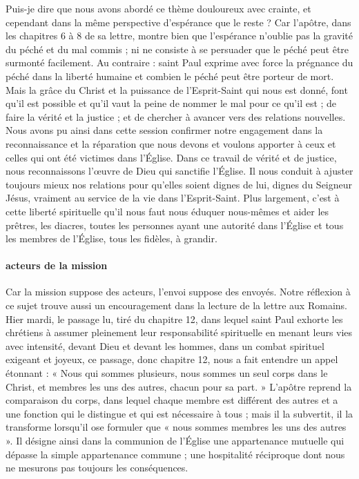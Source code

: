 Puis-je dire que nous avons abordé ce thème douloureux avec crainte, et cependant dans la même perspective d’espérance que le reste ? Car l’apôtre, dans les chapitres 6 à 8 de sa lettre, montre bien que l’espérance n’oublie pas la gravité du péché et du mal commis ; ni ne consiste à se persuader que le péché peut être surmonté facilement. Au contraire : saint Paul exprime avec force la prégnance du péché dans la liberté humaine et combien le péché peut être porteur de mort. Mais la grâce du Christ et la puissance de l’Esprit-Saint qui nous est donné, font qu’il est possible et qu’il vaut la peine de nommer le mal pour ce qu’il est ; de faire la vérité et la justice ; et de chercher à avancer vers des relations nouvelles.
Nous avons pu ainsi dans cette session confirmer notre engagement dans la reconnaissance et la réparation que nous devons et voulons apporter à ceux et celles qui ont été victimes dans l’Église. Dans ce travail de vérité et de justice, nous reconnaissons l’œuvre de Dieu qui sanctifie l’Église. Il nous conduit à ajuster toujours mieux nos relations pour qu’elles soient dignes de lui, dignes du Seigneur Jésus, vraiment au service de la vie dans l’Esprit-Saint. Plus largement, c’est à cette liberté spirituelle qu’il nous faut nous éduquer nous-mêmes et aider les prêtres, les diacres, toutes les personnes ayant une autorité dans l’Église et tous les membres de l’Église, tous les fidèles, à grandir.
\paragraph{acteurs de la mission}
Car la mission suppose des acteurs, l’envoi suppose des envoyés. Notre réflexion à ce sujet trouve aussi un encouragement dans la lecture de la lettre aux Romains. Hier mardi, le passage lu, tiré du chapitre 12, dans lequel saint Paul exhorte les chrétiens à assumer pleinement leur responsabilité spirituelle en menant leurs vies avec intensité, devant Dieu et devant les hommes, dans un combat spirituel exigeant et joyeux, ce passage, donc chapitre 12, nous a fait entendre un appel étonnant : « Nous qui sommes plusieurs, nous sommes un seul corps dans le Christ, et membres les uns des autres, chacun pour sa part. » L’apôtre reprend la comparaison du corps, dans lequel chaque membre est différent des autres et a une fonction qui le distingue et qui est nécessaire à tous ; mais il la subvertit, il la transforme lorsqu’il ose formuler que « nous sommes membres les uns des autres ». Il désigne ainsi dans la communion de l’Église une appartenance mutuelle qui dépasse la simple appartenance commune ; une hospitalité réciproque dont nous ne mesurons pas toujours les conséquences.

